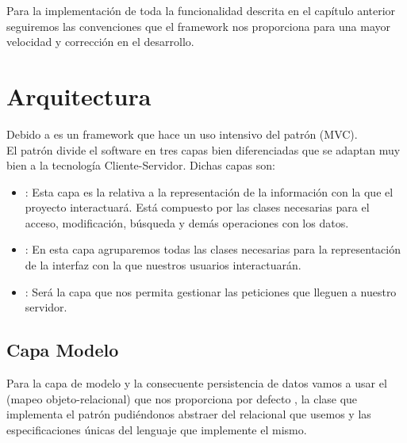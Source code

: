 
Para la implementación de toda la funcionalidad descrita en el capítulo anterior
seguiremos las convenciones que el framework  nos
proporciona para una mayor velocidad y corrección en el desarrollo.

\section{Arquitectura}

\label{pattern:mvc}
Debido a  es un framework que hace un uso intensivo del
patrón  (MVC). \\

El patrón  divide el software en tres capas
bien diferenciadas que se adaptan muy bien a la tecnología
Cliente-Servidor. Dichas capas son:

\begin{itemize}
\item {}: Esta capa es la relativa a la representación de la
  información con la que el proyecto interactuará. Está compuesto por las clases
  necesarias para el acceso, modificación, búsqueda y demás operaciones con los
  datos.
\item {}: En esta capa agruparemos todas las clases necesarias para
  la representación de la interfaz con la que nuestros usuarios interactuarán.
\item {}: Será la capa que nos permita gestionar las
  peticiones que lleguen a nuestro servidor.
\end{itemize}

\subsection{Capa Modelo}

Para la capa de modelo y la consecuente persistencia de datos vamos a usar el
 (mapeo objeto-relacional) que nos proporciona por defecto
, la clase  que implementa el
patrón  pudiéndonos abstraer del 
relacional que usemos y las especificaciones únicas del lenguaje 
que implemente el mismo.

